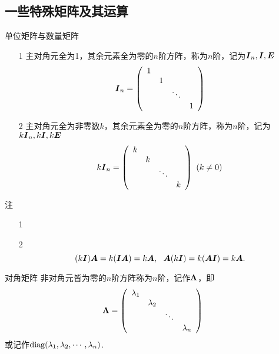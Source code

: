 \subsection{一些特殊矩阵及其运算}
\begin{frame}
  \begin{footnotesize}
    \begin{block}{单位矩阵与数量矩阵}
      \begin{itemize}
      \item[1] 主对角元全为1，其余元素全为零的$n$阶方阵，称为$n$阶，记为$\boldsymbol{I}_n, \boldsymbol{I}, \boldsymbol{E}$
        $$
        \boldsymbol{I}_n = \left(
          \begin{array}{cccc}
            1 & & &\\
              & 1 & & \\
              & & \ddots & \\
              & & & 1
          \end{array}
        \right)
        $$\pause 
      \item[2] 主对角元全为非零数$k$，其余元素全为零的$n$阶方阵，称为$n$阶，记为$k\boldsymbol{I}_n, k\boldsymbol{I}, k\boldsymbol{E}$
        $$
        k\boldsymbol{I}_n = \left(
          \begin{array}{cccc}
            k & & &\\
              & k & & \\
              & & \ddots & \\
              & & & k
          \end{array}
        \right)~(k\ne 0)
        $$
      \end{itemize}
    \end{block}
    \pause 
    \begin{block}{注}
      \begin{itemize}
      \item[1] \\ \pause 
      \item[2] 
        $$
        (k\boldsymbol{I}) \boldsymbol{A} = k(\boldsymbol{I}\boldsymbol{A}) = k\boldsymbol{A}, ~~
        \boldsymbol{A}(k\boldsymbol{I}) = k(\boldsymbol{A}\boldsymbol{I}) = k\boldsymbol{A}.
        $$
      \end{itemize}
    \end{block}
  \end{footnotesize}
\end{frame}


\begin{frame}
  \begin{footnotesize}
    \begin{block}{对角矩阵}
      非对角元皆为零的$n$阶方阵称为$n$阶，记作$\boldsymbol{\Lambda}$，即
      $$
      \boldsymbol{\Lambda} = \left(
        \begin{array}{cccc}
          \lambda_1 & & &\\
                    & \lambda_2 & & \\
                    & & \ddots & \\
                    & & & \lambda_n
        \end{array}
      \right)
      $$
      或记作$\mathrm{diag}(\lambda_1,\lambda_2,\cdots,\lambda_n)$.
    \end{block}
  \end{footnotesize}
\end{frame}


